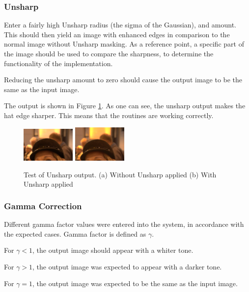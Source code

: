 \documentclass[10pt,a4paper]{article}
\begin{document}
\subsubsection{Unsharp}
Enter a fairly high Unsharp radius (the sigma of the Gaussian), and amount. This should then yield an image with enhanced edges in comparison to the normal image without Unsharp masking. As a reference
point, a specific part of the image should be used to compare the sharpness, to determine the
functionality of the implementation.

Reducing the unsharp amount to zero should cause the output image to be the same as the input image.

The output is shown in Figure \ref{unsharpoutputcomparison}. As one can see, the unsharp output makes the hat edge sharper. This means that the routines are working correctly.
\begin{figure}
    \centering
    \subfigure
    {
        \includegraphics[width=100px]{hat_blurry}
    }
    \subfigure
    {
        \includegraphics[width=100px]{rawflash_unsharp_test}
    }

    \caption{
        Test of Unsharp output. 
        (a) Without Unsharp applied
        (b) With Unsharp applied
    }
    \label{unsharpoutputcomparison}
 \end{figure}
\subsubsection{Gamma Correction}

Different gamma factor values were entered into the system, in accordance with the expected cases. Gamma factor is defined as $\gamma$.

For $\gamma < 1$, the output image should appear with a whiter tone.

For $\gamma > 1$, the output image was expected to appear with a darker tone.

For $\gamma = 1$, the output image was expected to be the same as the input image.
\end{document}
